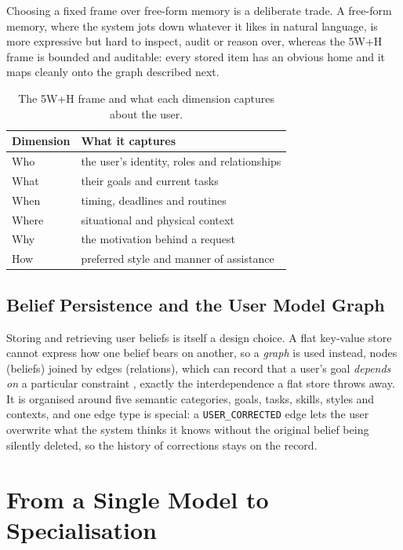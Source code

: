  Choosing a fixed frame over free-form memory is a deliberate trade. A free-form memory, where the system jots down whatever it likes in natural language, is more expressive but hard to inspect, audit or reason over, whereas the 5W+H frame is bounded and auditable: every stored item has an obvious home and it maps cleanly onto the graph described next. 

\begin{table}[t]
  \centering
  \caption{The 5W+H frame and what each dimension captures about the user.}
  \label{tab:5wh}
  \begin{tabular}{ll}
    \hline
    Dimension & What it captures \\
    \hline
    Who & the user's identity, roles and relationships \\
    What & their goals and current tasks \\
    When & timing, deadlines and routines \\
    Where & situational and physical context \\
    Why & the motivation behind a request \\
    How & preferred style and manner of assistance \\
    \hline
  \end{tabular}
\end{table}


\subsection{Belief Persistence and the User Model Graph}
\label{subsec:belief-persistence-and-the-user-model-graph}

Storing and retrieving user beliefs is itself a design choice. A flat key-value store cannot express how one belief bears on another, so a \emph{graph} is used instead, nodes (beliefs) joined by edges (relations), which can record that a user's goal \emph{depends on} a particular constraint \cite{wang2026memmachinegroundtruthpreservingmemorypersonalized, yang2026graphbasedagentmemorytaxonomy}, exactly the interdependence a flat store throws away. It is organised around five semantic categories, goals, tasks, skills, styles and contexts, and one edge type is special: a \texttt{USER\_CORRECTED} edge lets the user overwrite what the system thinks it knows without the original belief being silently deleted, so the history of corrections stays on the record.

\section{From a Single Model to Specialisation}
\label{sec:multi-model-and-thinker-executor-architectures}

